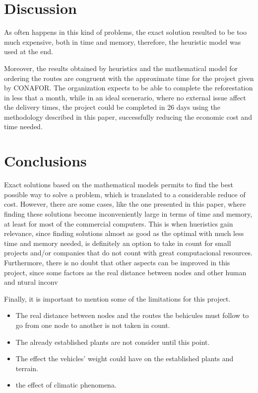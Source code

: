 \documentclass{amsart}
\begin{document}

    \section{Discussion}
    
    As often happens in this kind of problems, the exact solution resulted to be too much expensive, both in time and memory, therefore, the heuristic model was used at the end.
    
    Moreover, the results obtained by heuristics and the mathematical model for ordering the routes are congruent with the approximate time for the project given by CONAFOR. The organization expects to be able to complete the reforestation in less that a month, while in an ideal scenerario, where no external issue affect the delivery times, the project could be completed in 26 days using the methodology described in this paper, successfully reducing the economic cost and time needed.

    
    \section{Conclusions}
    Exact solutions based on the mathematical models permits to find the best possible way to solve a problem, which is translated to a considerable reduce of cost. However, there are some cases, like the one presented in this paper, where finding these solutions become inconveniently large in terms of time and memory, at least for most of the commercial computers. This is when hueristics gain relevance, since finding solutions almost as good as the optimal with much less time and memory needed, is definitely an option to take in count for small projects and/or companies that do not count with great computacional resources. 
    Furthermore, there is no doubt that other aspects can be improved in this project, since some factors as the real distance between nodes and other human and ntural inconv
    
    Finally, it is important to mention some of the limitations for this project. 
    \begin{itemize}
        \item The real distance between nodes and the routes the behicules must follow to go from one node to another is not taken in count.
        \item The already established plants are not consider until this point.
        \item The effect the vehicles' weight could have on the established plants and terrain.
        \item the effect of climatic phenomena.
    \end{itemize}
\end{document}
